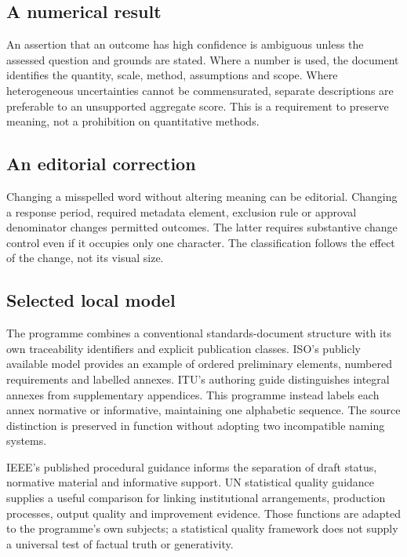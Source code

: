 \documentclass[11pt,a4paper]{article}
\begin{document}
\subsection{A numerical result}
An assertion that an outcome has high confidence is ambiguous unless the assessed question and grounds are stated. Where a number is used, the document identifies the quantity, scale, method, assumptions and scope. Where heterogeneous uncertainties cannot be commensurated, separate descriptions are preferable to an unsupported aggregate score. This is a requirement to preserve meaning, not a prohibition on quantitative methods.

\subsection{An editorial correction}
Changing a misspelled word without altering meaning can be editorial. Changing a response period, required metadata element, exclusion rule or approval denominator changes permitted outcomes. The latter requires substantive change control even if it occupies only one character. The classification follows the effect of the change, not its visual size.

\subsection{Selected local model}
The programme combines a conventional standards-document structure with its own traceability identifiers and explicit publication classes. ISO's publicly available model provides an example of ordered preliminary elements, numbered requirements and labelled annexes. ITU's authoring guide distinguishes integral annexes from supplementary appendices. This programme instead labels each annex normative or informative, maintaining one alphabetic sequence. The source distinction is preserved in function without adopting two incompatible naming systems.

IEEE's published procedural guidance informs the separation of draft status, normative material and informative support. UN statistical quality guidance supplies a useful comparison for linking institutional arrangements, production processes, output quality and improvement evidence. Those functions are adapted to the programme's own subjects; a statistical quality framework does not supply a universal test of factual truth or generativity.
\end{document}
